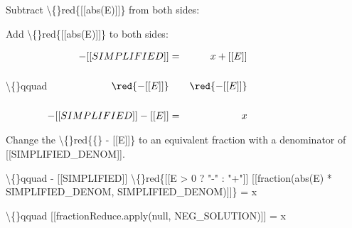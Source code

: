 \documentclass{article}
\begin{document}
\begin{itemize}
                                
                                    Subtract
                                    \textbackslash\{\}red\{[[abs(E)]]\}
                                    from both
                                    sides:
                                
                                    Add
                                    \textbackslash\{\}red\{[[abs(E)]]\}
                                    to both
                                    sides:
                                
                                \textbackslash\{\}qquad$\begin{aligned}
                                    - [[SIMPLIFIED]] &=&
                                    x + [[E]] \\ \\
                                    \red{- [[E]]} &&
                                    \red{- [[E]]} \\ \\
                                    -[[SIMPLIFIED]] - [[E]]
                                    &=& x
                                    \end{aligned}$
                                
                            
                            
                                
                                    Change the
                                    \textbackslash\{\}red\{\{\} - [[E]]\}
                                    to an equivalent fraction with a
                                    denominator of
                                    [[SIMPLIFIED\_DENOM]].
                                
                                \textbackslash\{\}qquad
                                    - [[SIMPLIFIED]]
                                    \textbackslash\{\}red\{[[E > 0 ? "-" : "+"]]
                                    [[fraction(abs(E) * SIMPLIFIED\_DENOM,
                                    SIMPLIFIED\_DENOM)]]\} = x
                                
                            
                            \textbackslash\{\}qquad
                                [[fractionReduce.apply(null,
                                NEG\_SOLUTION)]] = x
                            
                            
                                

\end{itemize}
\end{document}
